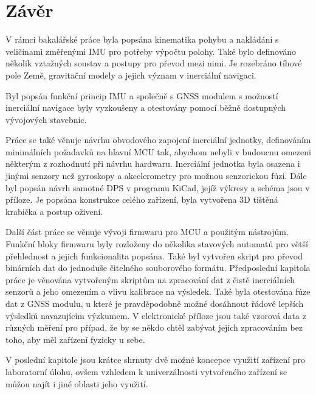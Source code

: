 \chapter*{Závěr}
{}
V rámci bakalářské práce byla popsána kinematika pohybu a nakládání s veličinami změřenými IMU pro potřeby výpočtu polohy. Také bylo definováno několik vztažných soustav a postupy pro převod mezi nimi. Je rozebráno tíhové pole Země, gravitační modely a jejich význam v inerciální navigaci.

Byl popsán funkční princip IMU a společně s GNSS modulem s možností inerciální navigace byly vyzkoušeny a otestovány pomocí běžně dostupných vývojových stavebnic.

Práce se také věnuje návrhu obvodového zapojení inerciální jednotky, definováním minimálních požadavků na hlavní MCU tak, abychom nebyli v budoucnu omezeni některým z rozhodnutí při návrhu hardwaru. Inerciální jednotka byla osazena i jinými senzory než gyroskopy a akcelerometry pro možnou senzorickou fúzi. Dále byl popsán návrh samotné DPS v programu KiCad, jejíž výkresy a schéma jsou v příloze. Je popsána konstrukce celého zařízení, byla vytvořena 3D tištěná krabička a postup oživení.

Další část práce se věnuje vývoji firmwaru pro MCU a použitým nástrojům. Funkční bloky firmwaru byly rozloženy do několika stavových automatů pro větší přehlednost a jejich funkcionalita popsána. Také byl vytvořen skript pro převod binárních dat do jednoduše čitelného souborového formátu.
Předposlední kapitola práce je věnována vytvořeným skriptům na zpracování dat z čistě inerciálních senzorů a jeho omezením a vlivu kalibrace na výsledek. Také byla otestována fúze dat z GNSS modulu, u které je pravděpodobně možné dosáhnout řádově lepších výsledků navazujícím výzkumem. V elektronické příloze jsou také vzorová data z různých měření pro případ, že by se někdo chtěl zabývat jejich zpracováním bez toho, aby měl zařízení fyzicky u sebe.

V poslední kapitole jsou krátce shrnuty dvě možné koncepce využití zařízení pro laboratorní úlohu, ovšem vzhledem k univerzálnosti vytvořeného zařízení se můžou najít i jiné oblasti jeho využití.

